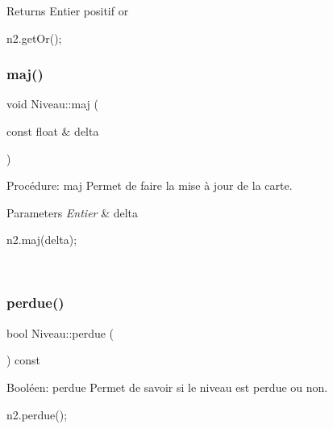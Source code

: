 \begin{DoxyReturn}{Returns}
Entier positif or 
\begin{DoxyCode}
n2.getOr();
\end{DoxyCode}
 
\end{DoxyReturn}
\mbox{\label{classNiveau_a3d1e0f0ec2d7b72eae985d0448c17dd5}} 
\subsubsection{\texorpdfstring{maj()}{maj()}}
{\footnotesize\ttfamily void Niveau\+::maj (\begin{DoxyParamCaption}\item[{const float \&}]{delta }\end{DoxyParamCaption})}



Procédure\+: maj Permet de faire la mise à jour de la carte. 


\begin{DoxyParams}{Parameters}
{\em Entier} & delta 
\begin{DoxyCode}
n2.maj(delta);
\end{DoxyCode}
 \\
\hline
\end{DoxyParams}
\mbox{\label{classNiveau_ad1345f4f482fdd18213cab3b4cd8b8dc}} 
\subsubsection{\texorpdfstring{perdue()}{perdue()}}
{\footnotesize\ttfamily bool Niveau\+::perdue (\begin{DoxyParamCaption}{ }\end{DoxyParamCaption}) const}



Booléen\+: perdue Permet de savoir si le niveau est perdue ou non. 


\begin{DoxyCode}
n2.perdue();
\end{DoxyCode}
 \mbox{\label{classNiveau_a11f7ce4e0918a94d41c66459394cdd49}} 
